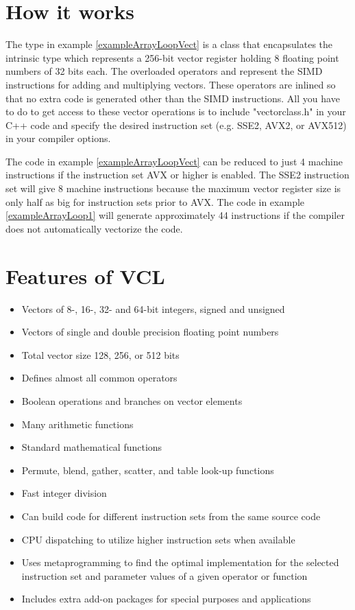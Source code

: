 \documentclass[vcl_manual.tex]{subfiles}
\begin{document}
\section{How it works} \label{HowItWorks}
The type  in example \ref{exampleArrayLoopVect} is a class that encapsulates the intrinsic type 
 which represents a 256-bit vector register holding 8 floating point numbers of 32 bits each. The overloaded operators \codei{+} and \codei{*} represent the SIMD instructions for adding and multiplying vectors. These operators are inlined so that no extra code is generated other than the SIMD instructions. All you have to do to get access to these vector operations is to include "vectorclass.h" in your C++ code and specify the desired instruction set (e.g. SSE2, AVX2, or AVX512) in your compiler options.

The code in example \ref{exampleArrayLoopVect} can be reduced to just 4 machine instructions if the instruction set AVX or higher is enabled. The SSE2 instruction set will give 8 machine instructions because the maximum vector register size is only half as big for instruction sets prior to AVX. The code in example \ref{exampleArrayLoop1} will generate approximately 44 instructions if the compiler does not automatically vectorize the code.

\section{Features of VCL} \label{Features}

\begin{itemize}
\item Vectors of 8-, 16-, 32- and 64-bit integers, signed and unsigned
\item Vectors of single and double precision floating point numbers
\item Total vector size 128, 256, or 512 bits
\item Defines almost all common operators
\item Boolean operations and branches on vector elements
\item Many arithmetic functions
\item Standard mathematical functions
\item Permute, blend, gather, scatter, and table look-up functions
\item Fast integer division
\item Can build code for different instruction sets from the same source code
\item CPU dispatching to utilize higher instruction sets when available
\item Uses metaprogramming to find the optimal implementation for the selected instruction set and parameter values of a given operator or function
\item Includes extra add-on packages for special purposes and applications
\end{itemize}
\end{document}
